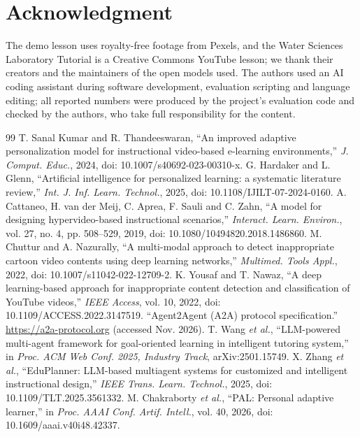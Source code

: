 \documentclass[conference,a4paper]{IEEEtran}
\begin{document}
\section*{Acknowledgment}
The demo lesson uses royalty-free footage from Pexels, and the Water Sciences Laboratory Tutorial is a Creative Commons
YouTube lesson; we thank their creators and the maintainers of the open models used. The authors used an AI coding
assistant during software development, evaluation scripting and language editing; all reported numbers were produced by
the project's evaluation code and checked by the authors, who take full responsibility for the content.

\balance
\begin{thebibliography}{99}
\footnotesize
{} T. Sanal Kumar and R. Thandeeswaran, ``An improved adaptive personalization model for instructional
video-based e-learning environments,'' \emph{J. Comput. Educ.}, 2024, doi: 10.1007/s40692-023-00310-x.
 G. Hardaker and L. Glenn, ``Artificial intelligence for personalized learning: a systematic
literature review,'' \emph{Int. J. Inf. Learn. Technol.}, 2025, doi: 10.1108/IJILT-07-2024-0160.
 A. Cattaneo, H. van der Meij, C. Aprea, F. Sauli and C. Zahn, ``A model for designing
hypervideo-based instructional scenarios,'' \emph{Interact. Learn. Environ.}, vol. 27, no. 4, pp. 508--529, 2019, doi:
10.1080/10494820.2018.1486860.
 M. Chuttur and A. Nazurally, ``A multi-modal approach to detect inappropriate cartoon video
contents using deep learning networks,'' \emph{Multimed. Tools Appl.}, 2022, doi: 10.1007/s11042-022-12709-2.
 K. Yousaf and T. Nawaz, ``A deep learning-based approach for inappropriate content detection and
classification of YouTube videos,'' \emph{IEEE Access}, vol. 10, 2022, doi: 10.1109/ACCESS.2022.3147519.
 ``Agent2Agent (A2A) protocol specification.'' \url{https://a2a-protocol.org} (accessed Nov. 2026).
 T. Wang \emph{et al.}, ``LLM-powered multi-agent framework for goal-oriented learning in intelligent
tutoring system,'' in \emph{Proc. ACM Web Conf. 2025, Industry Track}, arXiv:2501.15749.
 X. Zhang \emph{et al.}, ``EduPlanner: LLM-based multiagent systems for customized and intelligent
instructional design,'' \emph{IEEE Trans. Learn. Technol.}, 2025, doi: 10.1109/TLT.2025.3561332.
 M. Chakraborty \emph{et al.}, ``PAL: Personal adaptive learner,'' in \emph{Proc. AAAI Conf. Artif.
Intell.}, vol. 40, 2026, doi: 10.1609/aaai.v40i48.42337.

\end{thebibliography}
\end{document}
